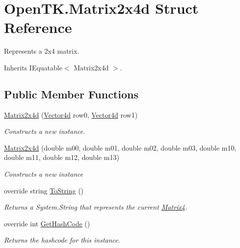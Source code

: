 \hypertarget{struct_open_t_k_1_1_matrix2x4d}{\section{Open\-T\-K.\-Matrix2x4d Struct Reference}
\label{struct_open_t_k_1_1_matrix2x4d}
}


Represents a 2x4 matrix.  




Inherits I\-Equatable$<$ Matrix2x4d $>$.

\subsection*{Public Member Functions}
\begin{DoxyCompactItemize}
\item 
\hyperlink{struct_open_t_k_1_1_matrix2x4d_ae8fb0f120b322fb576065eda90fbeba8}{Matrix2x4d} (\hyperlink{struct_open_t_k_1_1_vector4d}{Vector4d} row0, \hyperlink{struct_open_t_k_1_1_vector4d}{Vector4d} row1)
\begin{DoxyCompactList}\small\item\em Constructs a new instance. \end{DoxyCompactList}\item 
\hyperlink{struct_open_t_k_1_1_matrix2x4d_ab98efcc89a34a36483827c99a76c1934}{Matrix2x4d} (double m00, double m01, double m02, double m03, double m10, double m11, double m12, double m13)
\begin{DoxyCompactList}\small\item\em Constructs a new instance \end{DoxyCompactList}\item 
override string \hyperlink{struct_open_t_k_1_1_matrix2x4d_aa45f5985d5c89c496cf3916aa709f4b4}{To\-String} ()
\begin{DoxyCompactList}\small\item\em Returns a System.\-String that represents the current \hyperlink{struct_open_t_k_1_1_matrix4}{Matrix4}. \end{DoxyCompactList}\item 
override int \hyperlink{struct_open_t_k_1_1_matrix2x4d_a25621909c54f22fa193b3fdac3843712}{Get\-Hash\-Code} ()
\begin{DoxyCompactList}\small\item\em Returns the hashcode for this instance. \end{DoxyCompactList}\item 

\end{DoxyCompactItemize}
